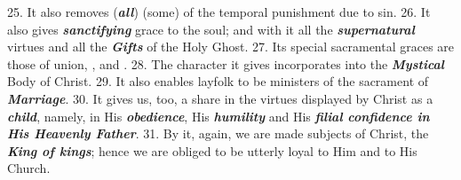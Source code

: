 \documentclass[a5paper]{article}
\newcommand\answer[1]{\textbf{\textit{#1}}}
\begin{document}
25. It also removes (\answer{all}) (some) of the temporal punishment due to sin.
26. It also gives \answer{sanctifying} grace to the soul; and with it all the \answer{supernatural} virtues and all the \answer{Gifts} of the Holy Ghost.
27. Its special sacramental graces are those of union, \answer{}, and \answer{}.
28. The character it gives incorporates into the \answer{Mystical} Body of Christ.
29. It also enables layfolk to be ministers of the sacrament of \answer{Marriage}.
30. It gives us, too, a share in the virtues displayed by Christ as a \answer{child}, namely, in His \answer{obedience}, His \answer{humility} and His \answer{filial confidence in His Heavenly Father}.
31. By it, again, we are made subjects of Christ, the \answer{King of kings}; hence we are obliged to be utterly loyal to Him and to His Church. 
\end{document}
